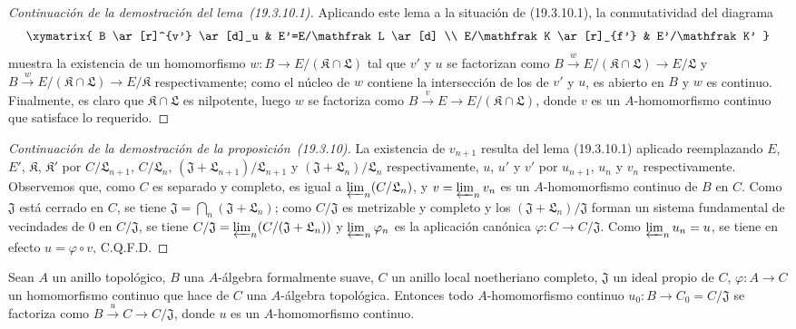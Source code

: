 \begin{proof}[Continuación de la demostración del lema~{\rm(19.3.10.1)}]
Aplicando este lema a la situación de (19.3.10.1), la conmutatividad del
diagrama
\[
\xymatrix{
  B \ar[r]^{v'} \ar[d]_u & E'=E/\mathfrak L \ar[d] \\
  E/\mathfrak K \ar[r]_{f'} & E'/\mathfrak K'
}
\]
muestra la existencia de un homomorfismo
$w:B\to E/(\mathfrak K\cap\mathfrak L)$ tal que $v'$ y $u$ se
factorizan como
$B\xrightarrow{w}E/(\mathfrak K\cap\mathfrak L)\to E/\mathfrak L$
y
$B\xrightarrow{w}E/(\mathfrak K\cap\mathfrak L)\to E/\mathfrak K$
respectivamente; como el núcleo de $w$ contiene la intersección de los de
$v'$ y $u$, es abierto en $B$ y $w$ es continuo. Finalmente, es claro
que $\mathfrak K\cap\mathfrak L$ es nilpotente, luego $w$ se factoriza como
$B\xrightarrow{v}E\to E/(\mathfrak K\cap\mathfrak L)$, donde $v$ es
un $A$-homomorfismo continuo que satisface lo requerido.
\end{proof}

\begin{proof}[Continuación de la demostración de la proposición~{\rm(19.3.10)}]
La existencia de $v_{n+1}$ resulta del lema (19.3.10.1) aplicado reemplazando
$E$, $E'$, $\mathfrak K$, $\mathfrak K'$ por
$C/\mathfrak L_{n+1}$, $C/\mathfrak L_n$,
$(\mathfrak J+\mathfrak L_{n+1})/\mathfrak L_{n+1}$ y
$(\mathfrak J+\mathfrak L_n)/\mathfrak L_n$ respectivamente, $u$, $u'$
y $v'$ por $u_{n+1}$, $u_n$ y $v_n$ respectivamente. Observemos que, como $C$
es separado y completo, es igual a $\varprojlim_n(C/\mathfrak L_n)$, y
$v=\varprojlim_n v_n$ es un $A$-homomorfismo continuo de $B$ en $C$.
Como $\mathfrak J$ está cerrado en $C$, se tiene
$\mathfrak J=\bigcap_n(\mathfrak J+\mathfrak L_n)$; como
$C/\mathfrak J$ es metrizable y completo y los
$(\mathfrak J+\mathfrak L_n)/\mathfrak J$ forman un sistema fundamental
de vecindades de $0$ en $C/\mathfrak J$, se tiene
$C/\mathfrak J=\varprojlim_n(C/(\mathfrak J+\mathfrak L_n))$
y $\varprojlim_n\varphi_n$ es la aplicación canónica
$\varphi:C\to C/\mathfrak J$. Como $\varprojlim_n u_n=u$, se tiene en efecto
$u=\varphi\circ v$, C.Q.F.D.
\end{proof}

\begin{corollary}[19.3.11]
\label{0.19.3.11-fr}
Sean $A$ un anillo topológico, $B$ una $A$-álgebra formalmente suave,
$C$ un anillo local noetheriano completo, $\mathfrak J$ un ideal propio de
$C$, $\varphi:A\to C$ un homomorfismo continuo que hace de $C$ una
$A$-álgebra topológica. Entonces todo $A$-homomorfismo continuo
$u_0:B\to C_0=C/\mathfrak J$ se factoriza como
$B\xrightarrow{u}C\to C/\mathfrak J$, donde $u$ es un $A$-homomorfismo
continuo.
\end{corollary}

